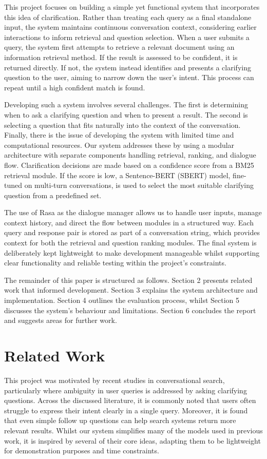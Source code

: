 \documentclass[11pt]{article}
\begin{document}
This project focuses on building a simple yet functional system that incorporates this idea of clarification. Rather than treating each query as a final standalone input, the system maintains continuous conversation context, considering earlier interactions to inform retrieval and question selection. When a user submits a query, the system first attempts to retrieve a relevant document using an information retrieval method. If the result is assessed to be confident, it is returned directly. If not, the system instead identifies and presents a clarifying question to the user, aiming to narrow down the user's intent. This process can repeat until a high confident match is found.

Developing such a system involves several challenges. The first is determining when to ask a clarifying question and when to present a result. The second is selecting a question that fits naturally into the context of the conversation. Finally, there is the issue of developing the system with limited time and computational resources. Our system addresses these by using a modular architecture with separate components handling retrieval, ranking, and dialogue flow. Clarification decisions are made based on a confidence score from a BM25 retrieval module. If the score is low, a Sentence-BERT (SBERT) model, fine-tuned on multi-turn conversations, is used to select the most suitable clarifying question from a predefined set.

The use of Rasa as the dialogue manager allows us to handle user inputs, manage context history, and direct the flow between modules in a structured way. Each query and response pair is stored as part of a conversation string, which provides context for both the retrieval and question ranking modules. The final system is deliberately kept lightweight to make development manageable whilst supporting clear functionality and reliable testing within the project's constraints.

The remainder of this paper is structured as follows. Section 2 presents related work that informed development. Section 3 explains the system architecture and implementation. Section 4 outlines the evaluation process, whilst Section 5 discusses the system's behaviour and limitations. Section 6 concludes the report and suggests areas for further work.


\section{Related Work}
This project was motivated by recent studies in conversational search, particularly where ambiguity in user queries is addressed by asking clarifying questions. Across the discussed literature, it is commonly noted that users often struggle to express their intent clearly in a single query. Moreover, it is found that even simple follow up questions can help search systems return more relevant results. Whilst our system simplifies many of the models used in previous work, it is inspired by several of their core ideas, adapting them to be lightweight for demonstration purposes and time constraints.
\end{document}
